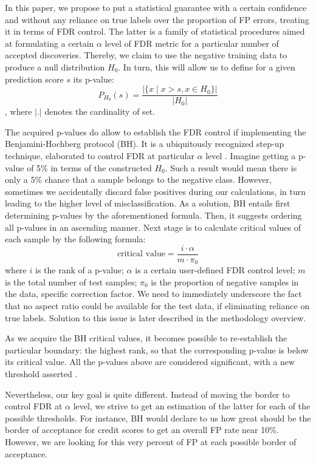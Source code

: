 \documentclass{article}
\begin{document}
In this paper, we propose to put a statistical guarantee with a certain confidence and without any reliance on true labels over the proportion of FP errors, treating it in terms of FDR control. The latter is a family of statistical procedures aimed at formulating a certain $\alpha$ level of FDR metric for a particular number of accepted discoveries. Thereby, we claim to use the negative training data to produce a null distribution $H_0$. In turn, this will allow us to define for a given prediction score $s$ its p-value: 
\begin{equation}
P_{H_0}(s)=\frac{|\{x\mid x>s, x \in H_0\}|}{|H_0|}
\end{equation}
, where $|.|$ denotes the cardinality of set. 

The acquired p-values do allow to establish the FDR control if implementing the Benjamini-Hochberg protocol (BH). It is a ubiquitously recognized step-up technique, elaborated to control FDR at particular $\alpha$ level \cite{BH}. Imagine getting a p-value of 5\% in terms of the constructed $H_0$. Such a result would mean there is only a 5\% chance that a sample belongs to the negative class.  However, sometimes we accidentally discard false positives during our calculations, in turn leading to the higher level of misclassification. As a solution, BH entails first determining p-values by the aforementioned formula. Then, it suggests ordering all p-values in an ascending manner. Next stage is to calculate critical values of each sample by the following formula:
\begin{equation}\label{eq:bh}
    \text{critical value} = \frac{i \cdot \alpha}{m\cdot \pi_0}
\end{equation}
where $i$ is the rank of a p-value;  $\alpha$ is a certain user-defined FDR control level; $m$ is the total number of test samples; $\pi_0$ is the proportion of negative samples in the data, specific correction factor. We need to immediately underscore the fact that no aspect ratio could be available for the test data, if eliminating reliance on true labels. Solution to this issue is later described in the methodology overview. 

As we acquire the BH critical values, it becomes possible to re-establish the particular boundary: the highest rank, so that the corresponding p-value is below its critical value. All the p-values above are considered significant, with a new threshold asserted \cite{qvalues}.

Nevertheless, our key goal is quite different. Instead of moving the border to control FDR at $\alpha$ level, we strive to get an estimation of the latter for each of the possible thresholds. For instance, BH would declare to us how great should be the border of acceptance for credit scores to get an overall FP rate near 10\%. However, we are looking for this very percent of FP at each possible border of acceptance. 
\end{document}
